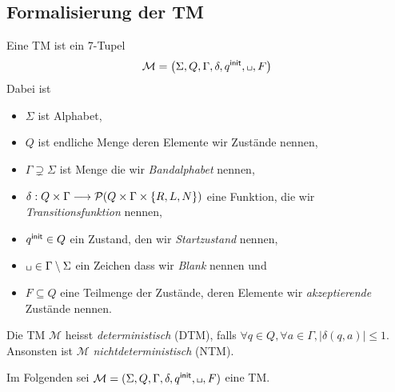 \subsection{Formalisierung der \ac{TM}} %
\begin{Def}[name={[\acs*{TM}]}] %
	Eine \ac{TM} ist ein 7-Tupel
	\begin{equation*}
		\mathcal{M}=\left(\Sigma,Q,\Gamma,\delta,\qinit,\blank,F\right)\\
	\end{equation*}
Dabei ist
	\begin{itemize}
		\item $\Sigma$ ist Alphabet,
		\item $Q$ ist endliche Menge deren Elemente wir Zustände nennen,
		\item $\Gamma\supsetneq\Sigma$ ist Menge die wir \emph{Bandalphabet} nennen,
		\item $\delta: Q\times\Gamma\--> \Powerset(Q\times\Gamma\times\{R,L,N\})$ eine Funktion, die wir \emph{Transitionsfunktion} nennen,
		\item $q^\mathsf{init}\in Q$ ein Zustand, den wir \emph{Startzustand} nennen,
		\item $\blank\in\Gamma\setminus\Sigma$ ein Zeichen dass wir \emph{Blank} nennen und
		\item $F\subseteq Q$ eine Teilmenge der Zustände, deren Elemente wir \emph{akzeptierende} Zustände nennen.
	\end{itemize}
        Die TM $\mathcal{M}$ heisst \emph{deterministisch}
        (DTM), falls $\forall q\in Q, \forall a\in\Gamma, |\delta
        (q,a)| \le 1$.\\
        Ansonsten ist $\mathcal{M}$ \emph{nichtdeterministisch} (NTM).
\end{Def}
Im Folgenden sei $\mathcal{M}=(\Sigma, Q, \Gamma, \delta, \qinit, \blank, F)$ eine \ac{TM}.



